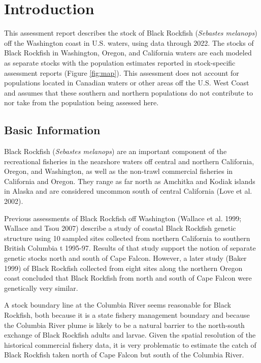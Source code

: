 \documentclass[11pt,
  english,
  letterpaper,
]{article}
\begin{document}
\hypertarget{introduction}{%
\section{Introduction}\label{introduction}}

This assessment report describes the stock of Black Rockfish (\emph{Sebastes melanops}) off the Washington coast in U.S. waters, using data through 2022. The stocks of Black Rockfish in Washington, Oregon, and California waters are each modeled as separate stocks with the population estimates reported in stock-specific assessment reports (Figure \ref{fig:map}). This assessment does not account for populations located in Canadian waters or other areas off the U.S. West Coast and assumes that these southern and northern populations do not contribute to nor take from the population being assessed here.

\hypertarget{basic-information}{%
\subsection{Basic Information}\label{basic-information}}

Black Rockfish (\emph{Sebastes melanops}) are an important component of the recreational fisheries in the nearshore waters off central and northern California, Oregon, and Washington, as well as the non-trawl commercial fisheries in California and Oregon. They range as far north as Amchitka and Kodiak islands in Alaska and are considered uncommon south of central California (Love et al. 2002).

Previous assessments of Black Rockfish off Washington (Wallace et al. 1999; Wallace and Tsou 2007) describe a study of coastal Black Rockfish genetic structure using 10 sampled sites collected from northern California to southern British Columbia t 1995-97. Results of that study support the notion of separate genetic stocks north and south of Cape Falcon. However, a later study (Baker 1999) of Black Rockfish collected from eight sites along the northern Oregon coast concluded that Black Rockfish from north and south of Cape Falcon were genetically very similar.

A stock boundary line at the Columbia River seems reasonable for Black Rockfish, both because it is a state fishery management boundary and because the Columbia River plume is likely to be a natural barrier to the north-south exchange of Black Rockfish adults and larvae. Given the spatial resolution of the historical commercial fishery data, it is very problematic to estimate the catch of Black Rockfish taken north of Cape Falcon but south of the Columbia River.
\end{document}
